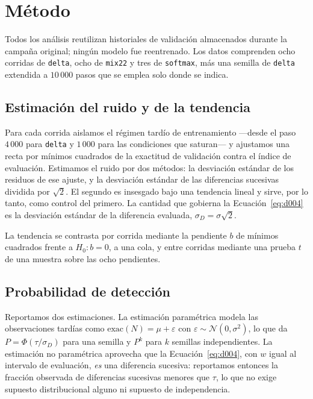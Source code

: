 \documentclass[jou,11pt,donotrepeattitle]{apa7}
\begin{document}
\section{M\'etodo}

Todos los an\'alisis reutilizan historiales de validaci\'on almacenados durante la campa\~na
original; ning\'un modelo fue reentrenado. Los datos comprenden ocho corridas de \texttt{delta},
ocho de \texttt{mix22} y tres de \texttt{softmax}, m\'as una semilla de \texttt{delta} extendida a
$10\,000$ pasos que se emplea solo donde se indica.

\subsection{Estimaci\'on del ruido y de la tendencia}

Para cada corrida aislamos el r\'egimen tard\'io de entrenamiento ---desde el paso $4\,000$ para
\texttt{delta} y $1\,000$ para las condiciones que saturan--- y ajustamos una recta por m\'inimos
cuadrados de la exactitud de validaci\'on contra el \'indice de evaluaci\'on. Estimamos el ruido
por dos m\'etodos: la desviaci\'on est\'andar de los residuos de ese ajuste, y la desviaci\'on
est\'andar de las diferencias sucesivas dividida por $\sqrt{2}$. El segundo es insesgado bajo una
tendencia lineal y sirve, por lo tanto, como control del primero. La cantidad que gobierna la
Ecuaci\'on~\ref{eq:d004} es la desviaci\'on est\'andar de la diferencia evaluada,
$\sigma_D = \sigma\sqrt{2}$.

La tendencia se contrasta por corrida mediante la pendiente $b$ de m\'inimos cuadrados frente a
$H_0\colon b = 0$, a una cola, y entre corridas mediante una prueba $t$ de una muestra sobre las
ocho pendientes.

\subsection{Probabilidad de detecci\'on}

Reportamos dos estimaciones. La estimaci\'on param\'etrica modela las observaciones tard\'ias
como $\mathrm{exac}(N) = \mu + \varepsilon$ con $\varepsilon \sim \mathcal{N}(0, \sigma^2)$, lo
que da $P = \Phi(\tau / \sigma_D)$ para una semilla y $P^{k}$ para $k$ semillas independientes.
La estimaci\'on no param\'etrica aprovecha que la Ecuaci\'on~\ref{eq:d004}, con $w$ igual al
intervalo de evaluaci\'on, \emph{es} una diferencia sucesiva: reportamos entonces la fracci\'on
observada de diferencias sucesivas menores que $\tau$, lo que no exige supuesto distribucional
alguno ni supuesto de independencia.
\end{document}

